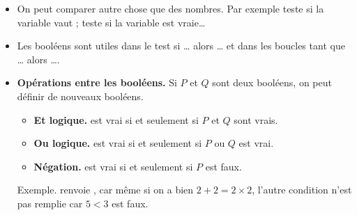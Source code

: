 \documentclass[11pt,class=report,crop=false]{standalone}
\begin{document}
 \begin{itemize} 
      
  \item On peut comparer autre chose que des nombres. Par exemple 
  \og{}\fg{} teste si la variable  vaut  ; \og{}\fg{} teste si la variable  est vraie\ldots
  
   \bigskip  
    
  \item Les booléens sont utiles dans le test \og{}si \ldots{} alors \ldots\fg{} et dans les boucles \og{}tant que \ldots{} alors \ldots\fg{}.
  
    \bigskip  
    
  \item \textbf{Opérations entre les booléens.}
  Si $P$ et $Q$ sont deux booléens, on peut définir de nouveaux booléens.
  \begin{itemize}
    \item \textbf{Et logique.}\quad \og{}\fg{} est vrai si et seulement si $P$ et $Q$ sont vrais.
    	\item \textbf{Ou logique.}\quad \og{}\fg{} est vrai si et seulement si $P$ ou $Q$ est vrai.
    	\item \textbf{Négation.}\quad \og{}\fg{} est vrai si et seulement si $P$ est faux.
  \end{itemize}  
   
    \bigskip  
     
  Exemple. \og{}\fg{} renvoie , car
  même si on a bien $2+2 = 2 \times 2$, l'autre condition n'est pas remplie car $5 < 3$ est faux.
  
  
\end{itemize}
\end{document}
